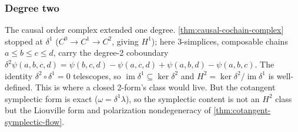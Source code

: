\subsubsection{Degree two}

\begin{theorem}\label{thm:causal-cohomology-h2}\leanok{}
The causal order complex extended one degree.
\cref{thm:causal-cochain-complex} stopped at $\delta^1$
($C^0 \to C^1 \to C^2$, giving $H^1$); here 3-simplices, composable chains
$a \leq b \leq c \leq d$, carry the degree-2 coboundary
$\delta^2 \psi(a,b,c,d) = \psi(b,c,d) - \psi(a,c,d) +
\psi(a,b,d) - \psi(a,b,c)$. The identity
$\delta^2 \circ \delta^1 = 0$ telescopes, so
$\operatorname{im}\delta^1 \subseteq \ker\delta^2$ and
$H^2 = \ker\delta^2 / \operatorname{im}\delta^1$ is well-defined. This is
where a closed 2-form's class would live. But the cotangent symplectic form is
exact ($\omega = \delta^1\lambda$), so the symplectic content is not an $H^2$
class but the Liouville form and polarization nondegeneracy of
\cref{thm:cotangent-symplectic-flow}.
\end{theorem}

